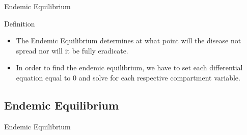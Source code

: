 \documentclass{beamer}
\begin{document}
\begin{frame}{Endemic Equilibrium}
    \begin{block}{Definition}
        \begin{itemize}
            \item The Endemic Equilibrium determines at what point will the disease not spread nor will it be fully eradicate.
            \item In order to find the endemic equilibrium, we have to set each differential equation equal to 0 and solve for each respective compartment variable.
        \end{itemize}
    \end{block}
\end{frame}


\subsection{Endemic Equilibrium}
\begin{frame}{Endemic Equilibrium}
\end{frame}
\end{document}
